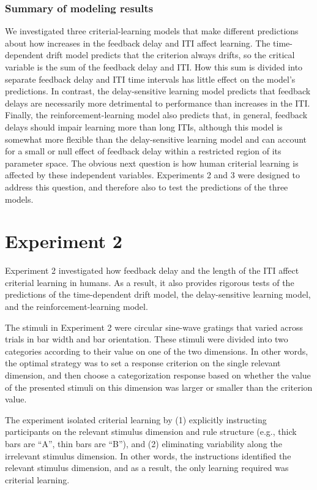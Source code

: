 \documentclass[doc, floatsintext]{apa7}
\begin{document}
\subsubsection{Summary of modeling results}
We investigated three criterial-learning models that make
different predictions about how increases in the feedback
delay and ITI affect learning. The time-dependent drift
model predicts that the criterion always drifts, so the
critical variable is the sum of the feedback delay and ITI.
How this sum is divided into separate feedback delay and ITI
time intervals has little effect on the model's predictions.
In contrast, the delay-sensitive learning model predicts
that feedback delays are necessarily more detrimental to
performance than increases in the ITI.  Finally, the
reinforcement-learning model also predicts that, in general,
feedback delays should impair learning more than long ITIs,
although this model is somewhat more flexible than the
delay-sensitive learning model and can account for a small
or null effect of feedback delay within a restricted region
of its parameter space. The obvious next question is how
human criterial learning is affected by these independent
variables. Experiments 2 and 3 were designed to address this
question, and therefore also to test the predictions of the
three models.

\section{Experiment 2}
Experiment 2 investigated how feedback delay and the length
of the ITI affect criterial learning in humans. As a result,
it also provides rigorous tests of the predictions of the
time-dependent drift model, the delay-sensitive learning
model, and the reinforcement-learning model.

The stimuli in Experiment 2 were circular sine-wave gratings
that varied across trials in bar width and bar orientation.
These stimuli were divided into two categories according to
their value on one of the two dimensions. In other words,
the optimal strategy was to set a response criterion on the
single relevant dimension, and then choose a categorization
response based on whether the value of the presented stimuli
on this dimension was larger or smaller than the criterion
value. 

The experiment isolated criterial learning by (1) explicitly
instructing participants on the relevant stimulus dimension
and rule structure (e.g., thick bars are ``A'', thin bars
are ``B''), and (2) eliminating variability along the
irrelevant stimulus dimension. In other words, the
instructions identified the relevant stimulus dimension, and
as a result, the only learning required was criterial
learning. 
\end{document}
